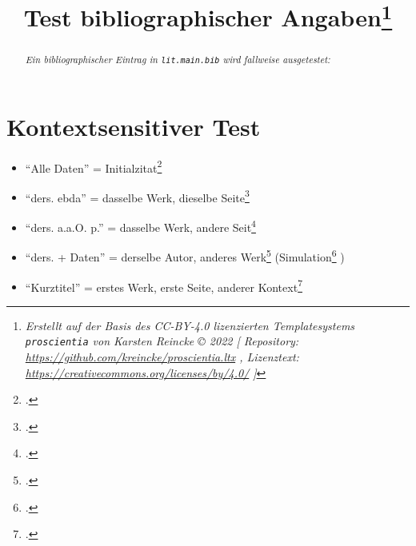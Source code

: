 \documentclass[
  DIV=calc,
  BCOR=5mm,
  11pt,
  headings=small,
  oneside,
  abstract=true,
  toc=bib,
  english,ngerman]{scrartcl}
\begin{document}
\nocite{*}

\titlehead{Bib\LaTeX}
\subject{Release 1.0}
\title{Test bibliographischer Angaben\footnote{
\textit{Erstellt auf der Basis des CC-BY-4.0 lizenzierten Templatesystems \texttt{proscientia} von Karsten Reincke \copyright{} 2022 [
Repository: \href{https://github.com/kreincke/proscientia.ltx}{https://github.com/kreincke/proscientia.ltx} ,
Lizenztext: \href{https://creativecommons.org/licenses/by/4.0/}{https://creativecommons.org/licenses/by/4.0/} ]}}
}


\maketitle
\begin{abstract}
\noindent \itshape
Ein bibliographischer Eintrag in \texttt{lit.main.bib} wird fallweise ausgetestet:
\end{abstract}



\section{Kontextsensitiver Test}

\begin{itemize}
  \item \enquote{Alle Daten} = Initialzitat\footcite[vgl.][123]{KantKdrV1974}
  \item \enquote{ders. ebda} = dasselbe Werk, dieselbe Seite\footcite[vgl.][123]{KantKdrV1974}
  \item \enquote{ders. a.a.O. p.} = dasselbe Werk, andere Seit\footcite[vgl.][125f]{KantKdrV1974}
  \item \enquote{ders. + Daten} = derselbe Autor, anderes Werk\footcite[vgl.][321]{KantKdpV1974} (Simulation\footcite[vgl.][42]{KantKdU1974} )
  \item \enquote{Kurztitel} = erstes Werk, erste Seite, anderer  Kontext\footcite[vgl.][123]{KantKdrV1974}
\end{itemize}



\printnomenclature
\printbibliography
\end{document}
